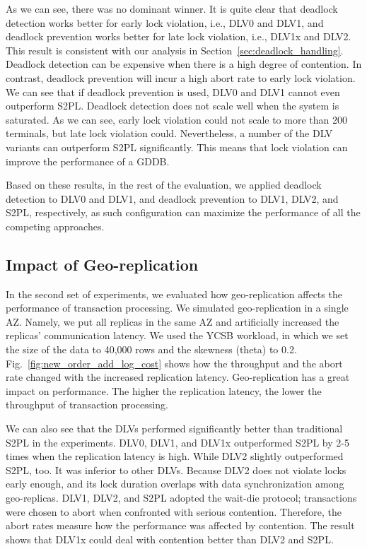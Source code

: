 \documentclass[conference]{IEEEtran}
\begin{document}
      
As we can see, there was no dominant winner. It is quite clear that deadlock detection works better for early lock violation, i.e., DLV0 and DLV1, 
and deadlock prevention works better for late lock violation, i.e., DLV1x and DLV2. This result is consistent with our analysis in Section~\ref{sec:deadlock_handling}.
Deadlock detection can be expensive when there is a high degree of contention. In contrast, deadlock prevention will incur a high abort rate to early lock violation.
We can see that if deadlock prevention is used, DLV0 and DLV1 cannot even outperform S2PL. 
Deadlock detection does not scale well when the system is saturated.
As we can see, early lock violation could not scale to more than 200 terminals, but late lock violation could.
Nevertheless, a number of the DLV variants can outperform S2PL significantly. This means that lock violation can improve the performance of a GDDB.

Based on these results, in the rest of the evaluation, we applied deadlock detection to DLV0 and DLV1, and deadlock prevention to DLV1, DLV2, and S2PL, respectively,
as such configuration can maximize the performance of all the competing approaches.


\subsection{Impact of Geo-replication}

In the second set of experiments, we evaluated how geo-replication affects the performance of transaction processing.
We simulated geo-replication in a single AZ.
Namely, we put all replicas in the same AZ and artificially increased the replicas' communication latency.
We used the YCSB workload, in which we set the size of the data to 40,000 rows and the skewness (theta) to 0.2.
Fig.~\ref{fig:new_order_add_log_cost} shows how the throughput and the abort rate changed with the increased replication latency.
Geo-replication has a great impact on performance. The higher the replication latency, the lower the throughput of transaction processing.

We can also see that the DLVs performed significantly better than traditional S2PL in the experiments.
DLV0, DLV1, and DLV1x outperformed S2PL by 2-5 times when the replication latency is high.
While DLV2 slightly outperformed S2PL, too. It was inferior to other DLVs.
Because DLV2 does not violate locks early enough, and its lock duration overlaps with data synchronization among geo-replicas.
DLV1, DLV2, and S2PL adopted the wait-die protocol; transactions were chosen to abort when confronted with serious contention.
Therefore, the abort rates measure how the performance was affected by contention.
The result shows that DLV1x could deal with contention better than DLV2 and S2PL.
\end{document}
